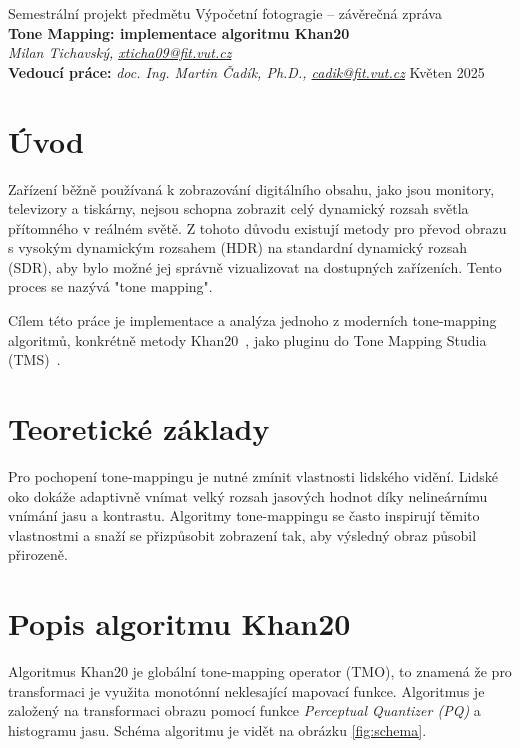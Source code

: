 \documentclass[11pt,a4paper,oneside]{article}
\begin{document}
\thispagestyle{empty}
\begin{center}
\vspace*{60mm}
{Semestrální projekt předmětu Výpočetní fotogragie -- závěrečná zpráva }\\
\smallskip
{\Large\bf Tone Mapping: implementace algoritmu Khan20}\\
\smallskip
{\it Milan Tichavský, \url{xticha09@fit.vut.cz}}\\
\vfill
{\bf Vedoucí práce:} {\it doc. Ing. Martin Čadík, Ph.D., \url{cadik@fit.vut.cz}} 
\hfill {Květen 2025}


\end{center}
\newpage


\section{Úvod}

Zařízení běžně používaná k zobrazování digitálního obsahu, jako jsou monitory,
televizory a tiskárny, nejsou schopna zobrazit celý dynamický rozsah světla
přítomného v reálném světě. Z tohoto důvodu existují metody pro převod obrazu s
vysokým dynamickým rozsahem (HDR) na standardní dynamický rozsah (SDR), aby bylo
možné jej správně vizualizovat na dostupných zařízeních. Tento proces se nazývá
"tone mapping".

Cílem této práce je implementace a analýza jednoho z moderních tone-mapping
algoritmů, konkrétně metody Khan20~\cite{Khan2020}, jako pluginu do Tone Mapping
Studia (TMS)~\cite{TMS2025}.

\section{Teoretické základy}

Pro pochopení tone-mappingu je nutné zmínit vlastnosti lidského vidění. Lidské
oko dokáže adaptivně vnímat velký rozsah jasových hodnot díky nelineárnímu
vnímání jasu a kontrastu. Algoritmy tone-mappingu se často inspirují těmito
vlastnostmi a snaží se přizpůsobit zobrazení tak, aby výsledný obraz působil
přirozeně.

\section{Popis algoritmu Khan20}

Algoritmus Khan20 je globální tone-mapping operator (TMO), to znamená že pro
transformaci je využita monotónní neklesající mapovací funkce. 
Algoritmus je založený na transformaci obrazu pomocí funkce \textit{Perceptual
Quantizer (PQ)} a histogramu jasu. Schéma algoritmu je vidět na obrázku
\ref{fig:schema}.
\end{document}
